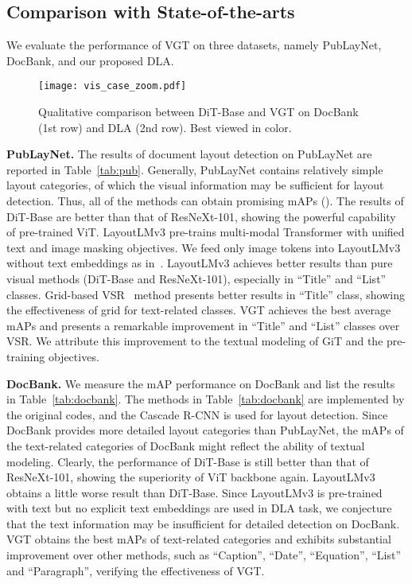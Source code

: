 \documentclass[10pt,twocolumn,letterpaper]{article}
\begin{document}
\subsection{Comparison with State-of-the-arts}
We evaluate the performance of VGT on three datasets, namely PubLayNet, DocBank, and our proposed DLA.

\begin{figure*}[!htp]\centering
\texttt{[image: vis\_case\_zoom.pdf]}
\caption{Qualitative comparison between DiT-Base and VGT on DocBank (1st row)  and DLA (2nd row). Best viewed in color.}
 \label{fig:vis_list}
\end{figure*}

\noindent
\textbf{PubLayNet.}  The results of document layout detection on PubLayNet are reported in Table~\ref{tab:pub}.
Generally, PubLayNet contains  relatively simple layout categories,
of which the visual information may be sufficient for layout detection.
Thus, all of the methods can obtain promising mAPs ().
The results of DiT-Base are better than that of ResNeXt-101, 
showing the powerful capability of pre-trained ViT.
LayoutLMv3 pre-trains multi-modal Transformer with unified text and image masking objectives.
We feed only image tokens into LayoutLMv3 without text embeddings as in~\cite{huang2022layoutlmv3}.
LayoutLMv3 achieves better results than pure visual methods (DiT-Base and ResNeXt-101), especially in ``Title'' and ``List'' classes.
Grid-based VSR~\cite{zhang2021vsr} method presents better results in ``Title'' class,
showing the effectiveness of grid for text-related classes.
VGT achieves the best average mAPs and presents a remarkable improvement in ``Title'' and ``List'' classes over VSR.
We attribute this improvement to the textual modeling of GiT and the pre-training objectives.

\noindent
\textbf{DocBank.} 
We measure the mAP performance on DocBank and list the results in Table~\ref{tab:docbank}.
The methods in Table~\ref{tab:docbank} are implemented by the original codes, and the Cascade R-CNN is used for layout detection.
Since DocBank provides more detailed layout categories than PubLayNet,
the mAPs of the text-related categories of DocBank might reflect the ability of textual modeling.
Clearly, the performance of DiT-Base is still better than that of ResNeXt-101, 
showing the superiority of ViT backbone again.
LayoutLMv3 obtains a little worse result than DiT-Base.
Since LayoutLMv3 is pre-trained with text but no explicit text embeddings are used in DLA task,
we conjecture that the text information may be insufficient for detailed detection on DocBank.
VGT obtains the best mAPs of text-related categories and exhibits substantial improvement over other methods, such as ``Caption'', ``Date'', ``Equation'', ``List'' and ``Paragraph'', verifying the effectiveness of VGT.
\end{document}
